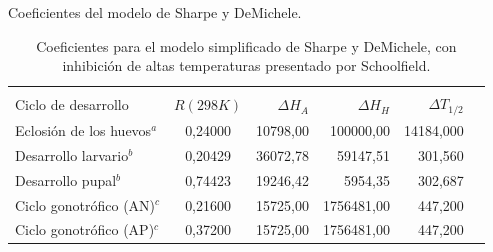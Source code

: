 \begin{frame}[t]{Coeficientes del modelo de Sharpe y DeMichele.}
\begin{table}
\begin{minipage}{\textwidth}
    \centering
    \small
    \caption{ \label{tab:coef-sharpe-demichele} Coeficientes para el modelo simplificado de Sharpe y DeMichele, con inhibición de altas temperaturas presentado por Schoolfield.}
    \begin{tabular}{l c r r r r }
        \hline \\
        Ciclo de desarrollo    & $R(298K)$ & $\Delta H_{A}$ & $\Delta H_{H}$ & $\Delta T_{1/2}$  \\
        \hline
        \hline
        Eclosión de los huevos$^a$ & 0,24000 & 10798,00 &  100000,00  & 14184,000\\
        Desarrollo larvario$^b$    & 0,20429 & 36072,78 &   59147,51  &   301,560\\
        Desarrollo pupal$^b$       & 0,74423 & 19246,42 &    5954,35  &   302,687\\
        Ciclo gonotrófico (AN)$^c$ & 0,21600 & 15725,00 & 1756481,00  &   447,200\\
        Ciclo gonotrófico (AP)$^c$ & 0,37200 & 15725,00 & 1756481,00  &   447,200\\
    \end{tabular}
\end{minipage}
\end{table}
\end{frame}


